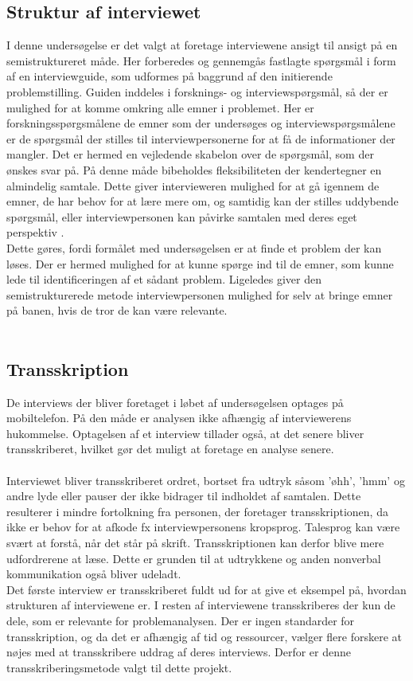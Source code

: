 \subsection {Struktur af interviewet}
I denne undersøgelse er det valgt at foretage interviewene ansigt til ansigt på en semistruktureret måde. Her forberedes og gennemgås fastlagte spørgsmål i form af en interviewguide, som udformes på baggrund af den initierende problemstilling. Guiden inddeles i forsknings- og interviewspørgsmål, så der er mulighed for at komme omkring alle emner i problemet. Her er forskningsspørgsmålene de emner som der undersøges og interviewspørgsmålene er de spørgsmål der stilles til interviewpersonerne for at få de informationer der mangler. Det er hermed en vejledende skabelon over de spørgsmål, som der ønskes svar på. På denne måde bibeholdes fleksibiliteten der kendertegner en almindelig samtale. Dette giver intervieweren mulighed for at gå igennem de emner, de har behov for at lære mere om, og samtidig kan der stilles uddybende spørgsmål, eller interviewpersonen kan påvirke samtalen med deres eget perspektiv \citep{brinkmann2014}.\\
Dette gøres, fordi formålet med undersøgelsen er at finde et problem der kan løses. Der er hermed mulighed for at kunne spørge ind til de emner, som kunne lede til identificeringen af et sådant problem. Ligeledes giver den semistrukturerede metode interviewpersonen mulighed for selv at bringe emner på banen, hvis de tror de kan være relevante.
\\
\\
\subsection{Transskription}
De interviews der bliver foretaget i løbet af undersøgelsen optages på mobiltelefon. På den måde er analysen ikke afhængig af interviewerens hukommelse. Optagelsen af et interview tillader også, at det senere bliver transskriberet, hvilket gør det muligt at foretage en analyse senere. 
\\
\\
Interviewet bliver transskriberet ordret, bortset fra udtryk såsom 'øhh', 'hmm' og andre lyde eller pauser der ikke bidrager til indholdet af samtalen. Dette resulterer i mindre fortolkning fra personen, der foretager transskriptionen, da ikke er behov for at afkode fx interviewpersonens kropsprog. Talesprog kan være svært at forstå, når det står på skrift. Transskriptionen kan derfor blive mere udfordrerene at læse.\citep{kvale2015} Dette er grunden til at udtrykkene og anden nonverbal kommunikation også bliver udeladt. 
\\
Det første interview er transskriberet fuldt ud for at give et eksempel på, hvordan strukturen af interviewene er. I resten af interviewene transskriberes der kun de dele, som er relevante for problemanalysen. Der er ingen standarder for transskription, og da det er afhængig af tid og ressourcer, vælger flere forskere at nøjes med at transskribere uddrag af deres interviews. \citep{brinkmann2014} \citep{kvale2015} Derfor er denne transskriberingsmetode valgt til dette projekt.
